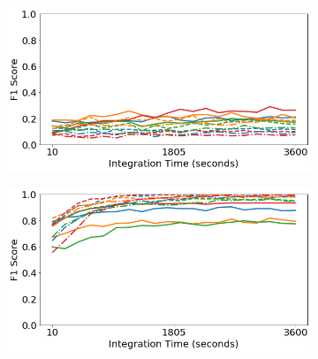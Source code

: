 \begin{figure}[H]
     \centering
     \begin{subfigure}[b]{0.49\textwidth}
         \centering
         \includegraphics[width=\textwidth]{images/generalization-dist-easy-01.png}
         \caption{}
         \label{fig:generalization-dist-easy-01}
     \end{subfigure}
     \hfill
     \begin{subfigure}[b]{0.49\textwidth}
         \centering
         \includegraphics[width=\textwidth]{images/generalization-dist-easy-05.png}
         \caption{}
         \label{fig:generalization-dist-easy-05}
     \end{subfigure}


\end{figure}
